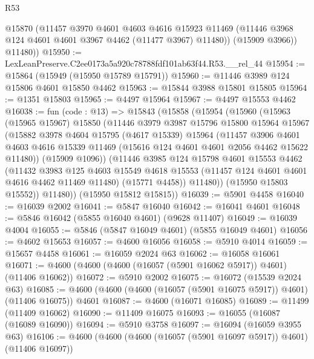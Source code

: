 \begin{lexlean}{R53}
\begin{coremodule}
          @15870
          (@11457
            @3970
            @4601
            @4603
            @4616
            @15923
            @11469
            (@11446 @3968 @124 @4601 @4601 @3967 @4462 (@11477 @3967) @11480))
          (@15909 @3966))
        @11480))
@15950 := LexLeanPreserve.C2ee0173a5a920c78788fdf101ab63f44.R53.__rel_44
@15954 := @15864 (@15949 (@15950 @15789 @15791))
@15960 := @11446 @3989 @124 @15806 @4601 @15850 @4462
@15963 := @15844 @3988 @15801 @15805
@15964 := @1351 @15803
@15965 := @4497 @15964
@15967 := @4497 @15553 @4462
@16038 := fun (code : @13) =>
  @15843
    (@15858
      (@15954
        (@15960
          (@15963
            (@15965 @15967)
            @15850
            (@11446
              @3979
              @3987
              @15796
              @15800
              @15964
              @15967
              (@15882
                @3978
                @4604
                @15795
                (@4617 @15339)
                @15964
                (@11457
                  @3906
                  @4601
                  @4603
                  @4616
                  @15339
                  @11469
                  (@15616 @124 @4601 @4601 @2056 @4462 @15622 @11480))
                (@15909 @1096))
              (@11446
                @3985
                @124
                @15798
                @4601
                @15553
                @4462
                (@11432
                  @3983
                  @125
                  @4603
                  @15549
                  @4618
                  @15553
                  (@11457 @124 @4601 @4601 @4616 @4462 @11469 @11480)
                  (@15771 @4458))
                @11480))
            (@15950 @15803 @15552))
          @11480))
      (@15950 @15812 @15815))
@16039 := @5901 @4458
@16040 := @16039 @2002
@16041 := @5847 @16040
@16042 := @16041 @4601
@16048 := @5846 @16042 (@5855 @16040 @4601) (@9628 @11407)
@16049 := @16039 @4004
@16055 := @5846 (@5847 @16049 @4601) (@5855 @16049 @4601)
@16056 := @4602 @15653
@16057 := @4600 @16056
@16058 := @5910 @4014
@16059 := @15657 @4458
@16061 := @16059 @2024 @63
@16062 := @16058 @16061
@16071 := @4600 (@4600 (@4600 (@16057 (@5901 @16062 @5917)) @4601) (@11406 @16062))
@16072 := @5910 @2002
@16075 := @16072 (@15539 @2024 @63)
@16085 := @4600 (@4600 (@4600 (@16057 (@5901 @16075 @5917)) @4601) (@11406 @16075)) @4601
@16087 := @4600 (@16071 @16085)
@16089 := @11499 (@11409 @16062)
@16090 := @11409 @16075
@16093 := @16055 (@16087 (@16089 @16090))
@16094 := @5910 @3758
@16097 := @16094 (@16059 @3955 @63)
@16106 := @4600 (@4600 (@4600 (@16057 (@5901 @16097 @5917)) @4601) (@11406 @16097))

\end{coremodule}
\end{lexlean}
